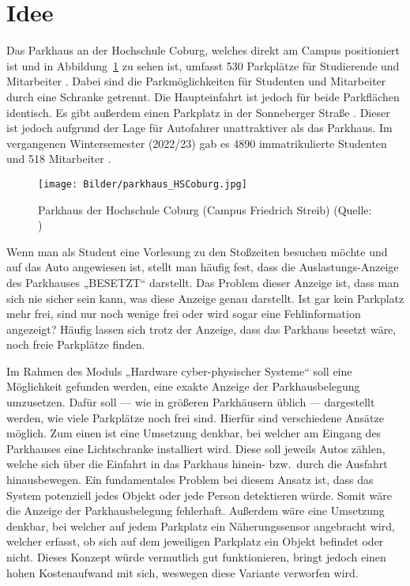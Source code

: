 \section{Idee}\label{ch:Einleitung}
Das Parkhaus an der Hochschule Coburg, welches direkt am Campus positioniert ist und in Abbildung~\ref{fig:Parkhaus} zu sehen ist, umfasst 530 Parkplätze für Studierende und Mitarbeiter \cite{parkhaus}.
Dabei sind die Parkmöglichkeiten für Studenten und Mitarbeiter durch eine Schranke getrennt.
Die Haupteinfahrt ist jedoch für beide Parkflächen identisch.
Es gibt außerdem einen Parkplatz in der Sonneberger Straße \cite{anfahrt}.
Dieser ist jedoch aufgrund der Lage für Autofahrer unattraktiver als das Parkhaus.
Im vergangenen Wintersemester (2022/23) gab es 4890 immatrikulierte Studenten und 518 Mitarbeiter \cite{HSCoburgZahlen}.

\begin{figure}[h]
	\myImagePos{}
	\texttt{[image: Bilder/parkhaus\_HSCoburg.jpg]}
	\caption[Parkhaus der Hochschule Coburg]{Parkhaus der Hochschule Coburg (Campus Friedrich Streib) (Quelle: \cite{parkhaus})}
	\label{fig:Parkhaus}
\end{figure}

Wenn man als Student eine Vorlesung zu den Stoßzeiten besuchen möchte und auf das Auto angewiesen ist, stellt man häufig fest, dass die Auslastungs-Anzeige des Parkhauses „BESETZT“ darstellt.
Das Problem dieser Anzeige ist, dass man sich nie sicher sein kann, was diese Anzeige genau darstellt.
Ist gar kein Parkplatz mehr frei, sind nur noch wenige frei oder wird sogar eine Fehlinformation angezeigt?
Häufig lassen sich trotz der Anzeige, dass das Parkhaus besetzt wäre, noch freie Parkplätze finden.

Im Rahmen des Moduls „Hardware cyber-physischer Systeme“ soll eine Möglichkeit gefunden werden, eine exakte Anzeige der Parkhausbelegung umzusetzen.
Dafür soll --- wie in größeren Parkhäusern üblich --- dargestellt werden, wie viele Parkplätze noch frei sind.
Hierfür sind verschiedene Ansätze möglich.
Zum einen ist eine Umsetzung denkbar, bei welcher am Eingang des Parkhauses eine Lichtschranke installiert wird.
Diese soll jeweils Autos zählen, welche sich über die Einfahrt in das Parkhaus hinein- bzw.\ durch die Ausfahrt hinausbewegen.
Ein fundamentales Problem bei diesem Ansatz ist, dass das System potenziell jedes Objekt oder jede Person detektieren würde.
Somit wäre die Anzeige der Parkhausbelegung fehlerhaft.
Außerdem wäre eine Umsetzung denkbar, bei welcher auf jedem Parkplatz ein Näherungssensor angebracht wird, welcher erfasst, ob sich auf dem jeweiligen Parkplatz ein Objekt befindet oder nicht.
Dieses Konzept würde vermutlich gut funktionieren, bringt jedoch einen hohen Kostenaufwand mit sich, weswegen diese Variante verworfen wird.

